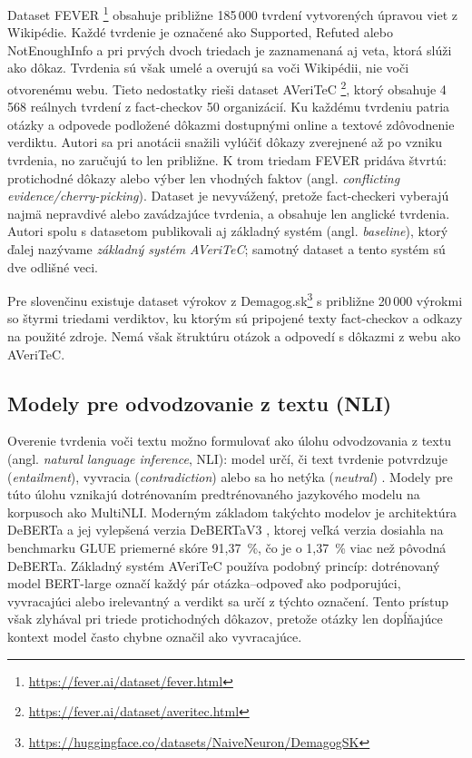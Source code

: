 \documentclass[a4paper,11pt]{article}
\begin{document}
Dataset FEVER \cite{thorne2018fever}\footnote{\url{https://fever.ai/dataset/fever.html}} obsahuje približne 185\,000 tvrdení
vytvorených úpravou viet z Wikipédie. Každé tvrdenie je označené ako
Supported, Refuted alebo NotEnoughInfo a pri prvých dvoch triedach je
zaznamenaná aj veta, ktorá slúži ako dôkaz. Tvrdenia sú však umelé
a overujú sa voči Wikipédii, nie voči otvorenému webu. Tieto nedostatky
rieši dataset AVeriTeC \cite{schlichtkrull2023averitec}\footnote{\url{https://fever.ai/dataset/averitec.html}}, ktorý obsahuje
4\,568 reálnych tvrdení z fact-checkov 50 organizácií. Ku každému tvrdeniu
patria otázky a odpovede podložené dôkazmi dostupnými online a textové
zdôvodnenie verdiktu. Autori sa pri anotácii snažili vylúčiť dôkazy
zverejnené až po vzniku tvrdenia, no zaručujú to len približne. K trom
triedam FEVER pridáva štvrtú: protichodné dôkazy alebo výber len
vhodných faktov (angl. \textit{conflicting evidence/cherry-picking}).
Dataset je nevyvážený, pretože fact-checkeri vyberajú najmä nepravdivé
alebo zavádzajúce tvrdenia, a obsahuje len anglické tvrdenia. Autori
spolu s datasetom publikovali aj základný systém (angl. \textit{baseline}),
ktorý ďalej nazývame \textit{základný systém AVeriTeC}; samotný dataset
a tento systém sú dve odlišné veci.

Pre slovenčinu existuje dataset výrokov z Demagog.sk\footnote{\url{https://huggingface.co/datasets/NaiveNeuron/DemagogSK}}
s približne 20\,000 výrokmi so štyrmi triedami verdiktov, ku ktorým sú
pripojené texty fact-checkov a odkazy na použité zdroje. Nemá však
štruktúru otázok a odpovedí s dôkazmi z webu ako AVeriTeC.

\subsection{Modely pre odvodzovanie z textu (NLI)}

Overenie tvrdenia voči textu možno formulovať ako úlohu odvodzovania
z textu (angl. \textit{natural language inference}, NLI): model určí, či
text tvrdenie potvrdzuje (\textit{entailment}), vyvracia
(\textit{contradiction}) alebo sa ho netýka (\textit{neutral})
\cite{guo2022survey}. Modely pre túto úlohu vznikajú dotrénovaním
predtrénovaného jazykového modelu na korpusoch ako MultiNLI.
Moderným základom takýchto modelov je architektúra DeBERTa
\cite{he2021deberta} a jej vylepšená verzia DeBERTaV3
\cite{he2023debertav3}, ktorej veľká verzia dosiahla na
benchmarku GLUE priemerné skóre 91,37~\%, čo je o 1,37~\% viac než pôvodná
DeBERTa. Základný systém AVeriTeC \cite{schlichtkrull2023averitec} používa
podobný princíp: dotrénovaný model BERT-large označí každý
pár otázka--odpoveď ako podporujúci, vyvracajúci alebo irelevantný a verdikt
sa určí z týchto označení. Tento prístup však zlyhával pri triede
protichodných dôkazov, pretože otázky len dopĺňajúce kontext model často
chybne označil ako vyvracajúce.
\end{document}

